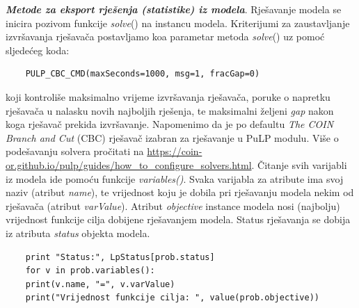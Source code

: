 \documentclass[a4paper, utf8, 11pt, colorlinks]{book}
\begin{document}
 \noindent \textbf{\emph{Metode za eksport rješenja (statistike) iz modela}}. Rješavanje modela se inicira pozivom funkcije \emph{solve}() na instancu modela. Kriterijumi za zaustavljanje izvršavanja rješavača postavljamo koa parametar metoda \emph{solve}()  uz pomoć sljedećeg koda:
 \begin{verbatim}
    PULP_CBC_CMD(maxSeconds=1000, msg=1, fracGap=0) 
\end{verbatim}
koji kontroliše maksimalno vrijeme izvršavanja rješavača, poruke o napretku rješavača u nalasku novih najboljih rješenja, te maksimalni željeni \emph{gap} nakon koga rješavač prekida izvršavanje. Napomenimo da je po defaultu \emph{The COIN Branch and Cut} (CBC) rješavač izabran za rješavanje u PuLP modulu. Više o podešavanju solvera pročitati na \url{https://coin-or.github.io/pulp/guides/how_to_configure_solvers.html}.  %
 Čitanje svih varijabli iz modela ide pomoću funkcije \emph{variables()}. Svaka varijabla za atribute ima svoj naziv (atribut \emph{name}), te vrijednost koju je dobila pri rješavanju modela nekim od rješavača (atribut \emph{varValue}). Atribut \emph{objective} instance modela nosi (najbolju) vrijednost funkcije cilja dobijene rješavanjem modela. Status rješavanja se dobija iz atributa \emph{status} objekta modela. 
 
 \begin{verbatim}
 	print "Status:", LpStatus[prob.status]
 	for v in prob.variables():
 	print(v.name, "=", v.varValue)
 	print("Vrijednost funkcije cilja: ", value(prob.objective))
  
 \end{verbatim}
\end{document}

